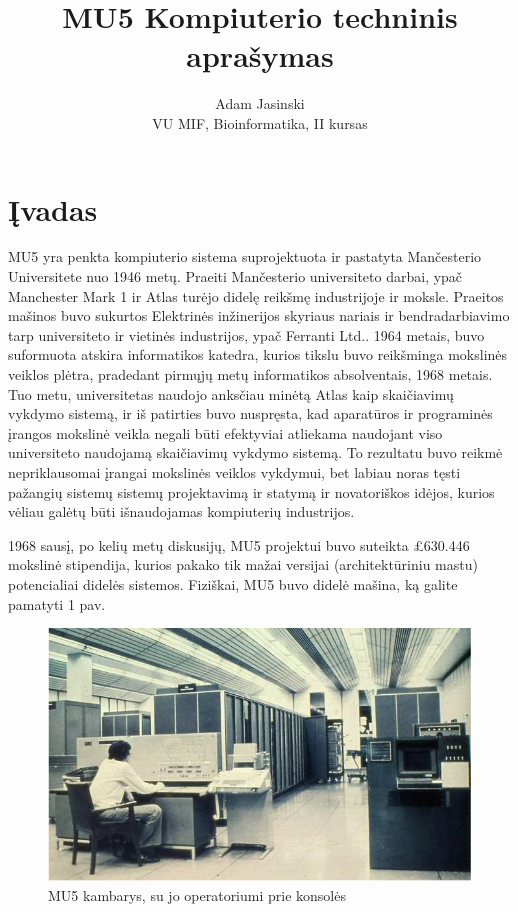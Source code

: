 \documentclass[a4paper,lithuanian]{article}
\title{MU5 Kompiuterio techninis aprašymas}
\author{
  Adam Jasinski\\
  VU MIF, Bioinformatika, II kursas
}
\begin{document}
\maketitle

\newpage

\section{Įvadas}

MU5 yra penkta kompiuterio sistema suprojektuota ir pastatyta Mančesterio Universitete nuo 1946 metų. Praeiti Mančesterio universiteto darbai, ypač \\Manchester Mark 1 ir Atlas turėjo didelę reikšmę industrijoje ir moksle. Praeitos mašinos buvo sukurtos Elektrinės inžinerijos skyriaus nariais ir bendradarbiavimo tarp universiteto ir vietinės industrijos, ypač Ferranti Ltd.. 1964 metais, buvo suformuota atskira informatikos katedra, kurios tikslu buvo reikšminga mokslinės veiklos plėtra, pradedant pirmųjų metų informatikos absolventais, 1968 metais. Tuo metu, universitetas naudojo anksčiau minėtą Atlas kaip skaičiavimų vykdymo sistemą, ir iš patirties buvo nuspręsta, kad aparatūros ir programinės įrangos mokslinė veikla negali būti efektyviai atliekama naudojant viso universiteto naudojamą skaičiavimų vykdymo sistemą. To rezultatu buvo reikmė nepriklausomai įrangai mokslinės veiklos vykdymui, bet labiau noras tęsti pažangių sistemų sistemų projektavimą ir statymą ir novatoriškos idėjos, kurios vėliau galėtų būti išnaudojamas kompiuterių industrijos.\newline

1968 sausį, po kelių metų diskusijų, MU5 projektui buvo suteikta £630.446 mokslinė stipendija, kurios pakako tik mažai versijai (architektūriniu mastu) potencialiai didelės sistemos. Fiziškai, MU5 buvo didelė mašina, ką galite pamatyti 1 pav.\newline



\begin{figure}[h]
	\includegraphics[scale=0.4]{mu5-room}
	\centering
	\caption{MU5 kambarys, su jo operatoriumi prie konsolės}
	\label{}
\end{figure}
\end{document}
